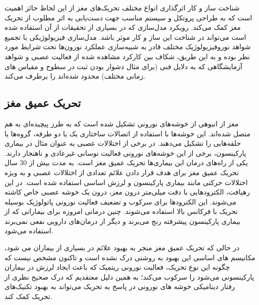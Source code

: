 شناخت ساز و کار اثرگذاری انواع مختلف تحریک‌های مغز از این لحاظ حائز اهمیت است که به طراحی پروتکل و سیستم مناسب جهت دست‌یابی به اثر مطلوب از تحریک مغز کمک می‌کند. رویکرد مدل‌سازی که در بسیاری از تحقیقات از آن استفاده شده است می‌تواند در شناخت این ساز و کار موثر باشد. مدل‌سازی فیزیولوژیکی با تجمیع شواهد نوروفیزیولوژیک مختلف قادر به شبیه‌سازی عملکرد نورون‌ها تحت شرایط مورد نظر بوده و به این طریق، شکاف بین کارکرد مشاهده شده از فعالیت عصبی و شواهد آزمایشگاهی که به دلایل فنی (برای مثال دشوار بودن ثبت در سطوح و مقیاس های زمانی مختلف) محدود شده‌اند را برطرف می‌کند. 


\subsection{تحریک عمیق مغز}

مغز از انبوهی از خوشه‌های نورونی تشکیل شده است که به طرز پیچیده‌ای به هم متصل شده‌اند. این خوشه‌ها با استفاده از اتصالات ساختاری یک یا دو طرفه، گروه‌ها یا حلقه‌هایی را تشکیل می‌دهند. 
در برخی از اختلالات عصبی به عنوان مثال در بیماری پارکینسون، برخی از این خوشه‌های نورونی فعالیت نوسانی غیرعادی و ناهنجار دارند. یکی از راه‌های درمان این بیماری‌ها تحریک عمیق مغز
 است.  به مدت بیش از 30 سال تحریک عمیق مغز برای هدف قرار دادن علائم تعدادی از اختلالات عصبی و به ویژه اختلالات حرکتی مانند بیماری پارکینسون و لرزش اساسی  استفاده شده است. در این رهیافت، الکترودهایی با دقت میلی‌متر درون مغز، درون یک خوشه عصبی خاص کاشته می‌شوند. این الکترودها برای سرکوب و تضعیف فعالیت نورونی پاتولوژیک بوسیله تحریک با فرکانس بالا استفاده می‌شوند. چنین درمانی امروزه برای بیمارانی که از بیماری پارکینسون پیشرفته رنج می‌برند و دیگر از درمان‌های دارویی نفعی نمی‌برند استفاده می‌شود. 

در حالی که تحریک عمیق مغز منجر به بهبود علائم در بسیاری از بیماران می شود، مکانیسم های اساسی این بهبود به روشنی درک نشده است و تاکنون مشخص نیست که چگونه این نوع تحریک، فعالیت نورونی ریتمیک که باعث ایجاد لرزش در بیماران پارکینسونی می‌شود را سرکوب می‌کند؛ به همین دلیل معتقدیم که درک صحیح نظری از رفتار دینامیکی خوشه های نورونی در پاسخ به تحریک می‌تواند به بهبود تکنیک‌های تحریک کمک کند.

